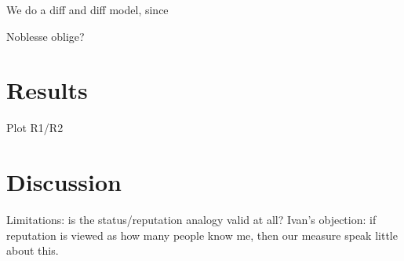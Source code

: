 \documentclass{article}
\begin{document}
We do a diff and diff model, since 

Noblesse oblige?

\section{Results}
Plot R1/R2



\section{Discussion}




Limitations: is the status/reputation analogy valid at all? Ivan's objection: if reputation is viewed as how many people know me, then our measure speak little about this.
\end{document}
